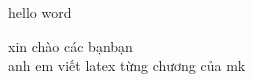 \documentclass[12pt]{report}
\begin{document}
hello word 



xin chào các bạnbạn\\
anh em viết latex từng chương của mk
\end{document}
